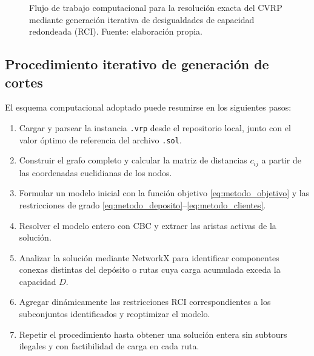 \begin{figure}[H]
{%
    }
    \shorthandon{<>}
    \caption{Flujo de trabajo computacional para la resolución exacta del CVRP mediante generación iterativa de desigualdades de capacidad redondeada (RCI). Fuente: elaboración propia.}
    \label{fig:flujo_cvrp}
\end{figure}


\subsection{Procedimiento iterativo de generación de cortes}

El esquema computacional adoptado puede resumirse en los siguientes pasos:
\begin{enumerate}
    \item Cargar y parsear la instancia \texttt{.vrp} desde el repositorio local, junto con el valor óptimo de referencia del archivo \texttt{.sol}.
    \item Construir el grafo completo y calcular la matriz de distancias $c_{ij}$ a
          partir de las coordenadas euclidianas de los nodos.
    \item Formular un modelo inicial con la función objetivo
          \eqref{eq:metodo_objetivo} y las restricciones de grado
          \eqref{eq:metodo_deposito}--\eqref{eq:metodo_clientes}.
    \item Resolver el modelo entero con CBC y extraer las aristas activas de la
          solución.
    \item Analizar la solución mediante NetworkX para identificar componentes conexas
          distintas del depósito o rutas cuya carga acumulada exceda la capacidad $D$.
    \item Agregar dinámicamente las restricciones RCI correspondientes a los
          subconjuntos identificados y reoptimizar el modelo.
    \item Repetir el procedimiento hasta obtener una solución entera sin subtours
          ilegales y con factibilidad de carga en cada ruta.
\end{enumerate}

